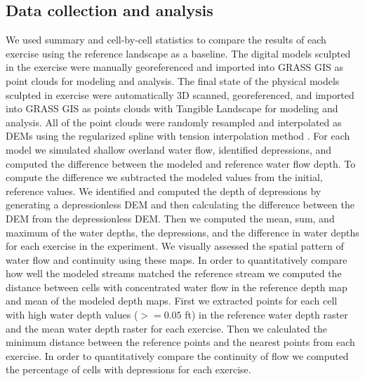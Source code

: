 \documentclass{isprs}
\begin{document}
\subsection{Data collection and analysis}
We used summary and cell-by-cell statistics to compare the results of each exercise 
using the reference landscape as a baseline. 
The digital models sculpted in the  exercise were manually georeferenced and imported into GRASS GIS as point clouds for modeling and analysis. 
The final state of the physical models sculpted in  exercise were automatically 3D scanned, georeferenced, and imported into GRASS GIS as points clouds 
with Tangible Landscape for modeling and analysis. 
All of the point clouds were randomly resampled and interpolated as DEMs using the regularized spline with tension interpolation method \cite{Mitasova2005}. 
For each model we simulated shallow overland water flow, identified depressions,
and computed the difference between the modeled and reference water flow depth. 
To compute the difference we subtracted the modeled values from the initial, reference values. %
We identified and computed the depth of depressions by generating a depressionless DEM and then calculating the difference between the DEM from the depressionless DEM.
Then we computed the mean, sum, and maximum of the water depths, the depressions, and the difference in water depths for each exercise in the experiment. 
We visually assessed the spatial pattern of water flow and continuity using these maps. 
%
In order to quantitatively compare how well the modeled streams matched the reference stream
we computed the distance between cells with concentrated water flow in the reference depth map and mean of the modeled depth maps. First we extracted points for each cell with high water depth values ($>=0.05$ ft) in the reference water depth raster and the mean water depth raster for each exercise. Then we calculated the minimum distance between the reference points and the nearest points from each exercise. 
%
In order to quantitatively compare the continuity of flow we computed the percentage of cells with depressions for each exercise.

\end{document}
